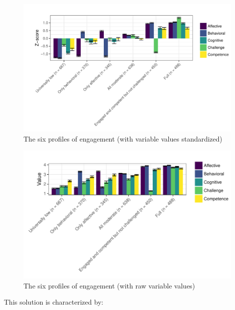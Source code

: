 \documentclass[]{msu-thesis}
\theoremstyle{definition}
\theoremstyle{definition}
\theoremstyle{definition}
\theoremstyle{remark}
\begin{document}
\begin{figure}

{\centering \includegraphics[width=1\linewidth]{rosenberg-dissertation_files/figure-latex/unnamed-chunk-11-1} 

}

\caption{The six profiles of engagement (with variable values standardized)}\label{fig:unnamed-chunk-11}
\end{figure}

\begin{figure}

{\centering \includegraphics[width=0.8\linewidth]{rosenberg-dissertation_files/figure-latex/unnamed-chunk-12-1} 

}

\caption{The six profiles of engagement (with raw variable values)}\label{fig:unnamed-chunk-12}
\end{figure}

This solution is characterized by:
\end{document}
